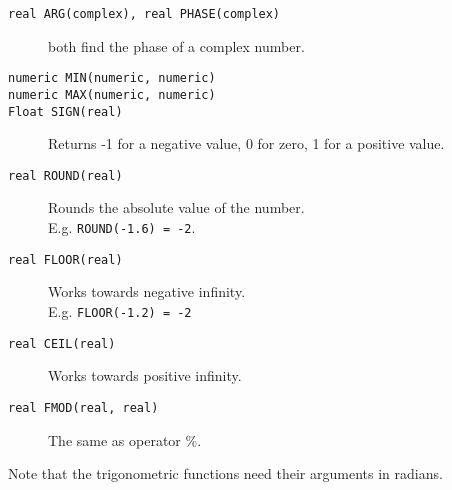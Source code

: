 \begin{description}
  \item[ \texttt{real ARG(complex),  real PHASE(complex)}]
     both find the phase of a complex number.
  \item[ \texttt{numeric MIN(numeric, numeric)}]
  \item[ \texttt{numeric MAX(numeric, numeric)}]
  \item[ \texttt{Float SIGN(real)}]
       Returns -1 for a negative value, 0 for zero, 1 for a positive value.
  \item[ \texttt{real ROUND(real)}]
       Rounds the absolute value of the number.
       \\E.g. \texttt{ROUND(-1.6) = -2}.
  \item[ \texttt{real FLOOR(real)}]
       Works towards negative infinity.
       \\E.g. \texttt{FLOOR(-1.2) = -2}
  \item[ \texttt{real CEIL(real)}] Works towards positive infinity.
  \item[ \texttt{real FMOD(real, real)}] The same as operator \%.
\end{description}
Note that the trigonometric functions need their arguments in radians.

